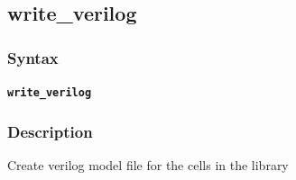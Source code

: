\pagebreak
\subsection*{write_verilog}
\subsubsection*{Syntax}
\texttt{\textbf{write_verilog}}\newline
\hspace*{0.5cm}\newline
\subsubsection*{Description}
Create verilog model file for the cells in the library